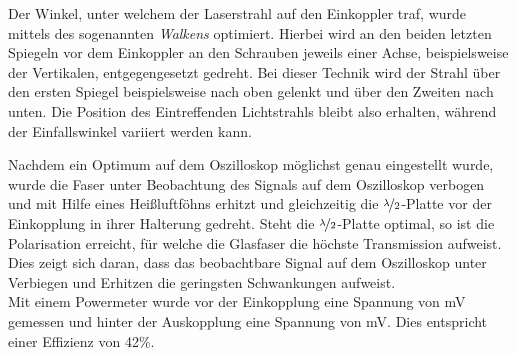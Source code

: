 Der Winkel, unter welchem der Laserstrahl auf den Einkoppler traf, wurde mittels des sogenannten \textit{Walkens} optimiert. Hierbei wird an den beiden letzten Spiegeln vor dem Einkoppler an den Schrauben jeweils einer Achse, beispielsweise der Vertikalen, entgegengesetzt gedreht. Bei dieser Technik wird der Strahl über den ersten Spiegel beispielsweise nach oben gelenkt und über den Zweiten nach unten. Die Position des Eintreffenden Lichtstrahls bleibt also erhalten, während der Einfallswinkel variiert werden kann. 

Nachdem ein Optimum auf dem Oszilloskop möglichst genau eingestellt wurde, wurde die Faser unter Beobachtung des Signals auf dem Oszilloskop verbogen und mit Hilfe eines Heißluftföhns erhitzt und gleichzeitig die $\nicefrac{\lambda}{2}$-Platte vor der Einkopplung in ihrer Halterung gedreht. Steht die $\nicefrac{\lambda}{2}$-Platte optimal, so ist die Polarisation erreicht, für welche die Glasfaser die höchste Transmission aufweist. Dies zeigt sich daran, dass das beobachtbare Signal auf dem Oszilloskop unter Verbiegen und Erhitzen die geringsten Schwankungen aufweist. \\
Mit einem Powermeter wurde vor der Einkopplung eine Spannung von \unit[420]{mV} gemessen und hinter der Auskopplung eine Spannung von \unit[244]{mV}. Dies entspricht einer Effizienz von 42\%. 

